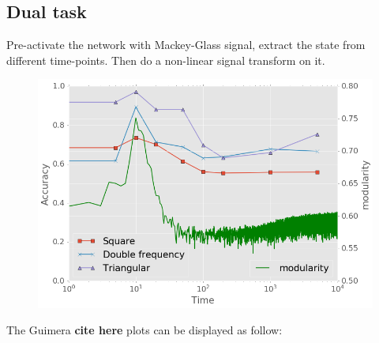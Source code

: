 \documentclass[%
 reprint,
 amsmath,amssymb,
 aps,
]{revtex4-2}
\begin{document}
\subsection{Dual task}

Pre-activate the network with Mackey-Glass signal, extract the state from different time-points. Then do a non-linear signal transform on it.

\begin{figure}[h]
	\centering
	\includegraphics[width=1\linewidth]{figure/dual_task}
	\caption{}
	\label{fig:dual_task}
\end{figure}

The Guimera \textbf{cite here} plots can be displayed as follow:
 
\end{document}
